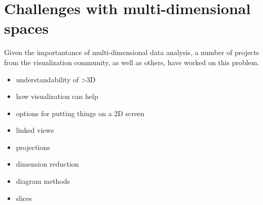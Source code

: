 \section{Challenges with multi-dimensional
spaces}\label{challenges-with-multi-dimensional-spaces}

Given the importantance of multi-dimensional data analysis, a number of
projects from the visualization community, as well as others, have worked on
this problem. 

\begin{itemize}
\tightlist
\item
  understandability of \textgreater{}3D
\item
  how visualization can help
\item
  options for putting things on a 2D screen
\item
  linked views
\item
  projections
\item
  dimension reduction
\item
  diagram methods
\item
  slices
\end{itemize}

